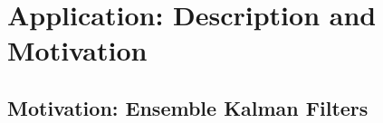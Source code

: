 \documentclass[conference,final]{IEEEtran}
\begin{document}
\section{Application: Description and Motivation} 

\subsection{Motivation: Ensemble Kalman Filters}


\end{document}
